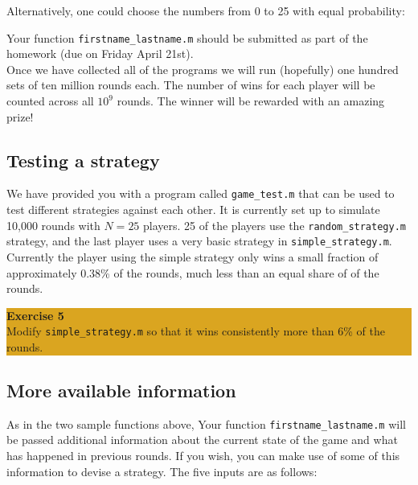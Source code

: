 \documentclass[12pt]{amsart}
\begin{document}


\noindent Alternatively, one could choose the numbers from 0 to 25 with
equal probability: 



\noindent Your function \texttt{firstname\_lastname.m}  should be submitted as part of the homework (due on Friday April 21st).\\

\noindent Once we have collected all of the programs we will run  (hopefully) one hundred sets of ten
million rounds each. The number of wins for each player will be counted across
all $10^9$ rounds. The winner will be rewarded with an amazing prize!

\subsection{Testing a strategy}
We have provided you with a program called \texttt{game\_test.m} that can be
used to test different strategies against each other.   It is currently set up to
simulate 10,000 rounds with $N=25$ players.  25 of the players use the
\texttt{random\_strategy.m} strategy, and the last player uses a very basic
strategy in \texttt{simple\_strategy.m}. Currently the player using the simple
strategy only wins a small fraction of approximately 0.38\% of the rounds, much less
than an equal share of  of the rounds.

\bigskip
\begin{center}
\colorbox{Goldenrod}{\parbox{15cm}{
{
\textbf{\large Exercise 5}\vspace{1mm} \\
Modify \texttt{simple\_strategy.m} so that it wins consistently more than
6\% of the rounds.}}}
\end{center}

\subsection{More available information}
As in the two sample functions above, Your function  \texttt{firstname\_lastname.m} will be passed additional information about the
current state of the game and what has happened in previous rounds. If you
wish, you can make use of some of this information to devise a strategy. The
five inputs are as follows: \\
\end{document}
